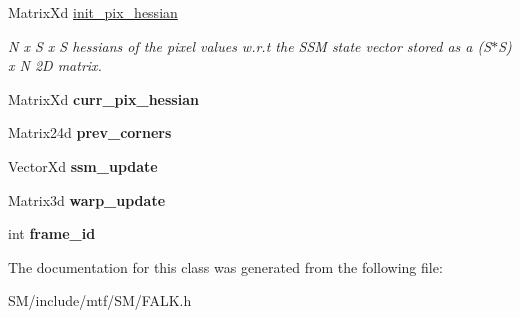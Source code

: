 \begin{DoxyCompactItemize}
\item 
\hypertarget{classFALK_a684f543f251d55ed03b3d485066c53c6}{Matrix\-Xd \hyperlink{classFALK_a684f543f251d55ed03b3d485066c53c6}{init\-\_\-pix\-\_\-hessian}}\label{classFALK_a684f543f251d55ed03b3d485066c53c6}

\begin{DoxyCompactList}\small\item\em N x S x S hessians of the pixel values w.\-r.\-t the S\-S\-M state vector stored as a (S$\ast$\-S) x N 2\-D matrix. \end{DoxyCompactList}\item 
\hypertarget{classFALK_a47e18fd05f0ee46ad2b561db3a103bd3}{Matrix\-Xd {\bfseries curr\-\_\-pix\-\_\-hessian}}\label{classFALK_a47e18fd05f0ee46ad2b561db3a103bd3}

\item 
\hypertarget{classFALK_a70884ec27965ec6867cc254600063943}{Matrix24d {\bfseries prev\-\_\-corners}}\label{classFALK_a70884ec27965ec6867cc254600063943}

\item 
\hypertarget{classFALK_ac436569dcc13c6b903893934938c3c36}{Vector\-Xd {\bfseries ssm\-\_\-update}}\label{classFALK_ac436569dcc13c6b903893934938c3c36}

\item 
\hypertarget{classFALK_a6b36dc5832e82e11ee417362fcc3aa7f}{Matrix3d {\bfseries warp\-\_\-update}}\label{classFALK_a6b36dc5832e82e11ee417362fcc3aa7f}

\item 
\hypertarget{classFALK_a3035161f4a1c1d4c7dc12a42b5388303}{int {\bfseries frame\-\_\-id}}\label{classFALK_a3035161f4a1c1d4c7dc12a42b5388303}

\end{DoxyCompactItemize}


The documentation for this class was generated from the following file\-:\begin{DoxyCompactItemize}
\item 
S\-M/include/mtf/\-S\-M/F\-A\-L\-K.\-h\end{DoxyCompactItemize}
